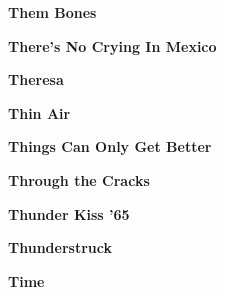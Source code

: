 \newline
\vspace{10pt} 
\begin{center}\textbf{Them Bones}\end{center}
\newline
\vspace{10pt} 
\begin{center}\textbf{There's No Crying In Mexico}\end{center}
\newline
\vspace{10pt} 
\begin{center}\textbf{Theresa}\end{center}
\newline
\vspace{10pt} 
\begin{center}\textbf{Thin Air}\end{center}
\newline
\vspace{10pt} 
\begin{center}\textbf{Things Can Only Get Better}\end{center}
\newline
\vspace{10pt} 
\begin{center}\textbf{Through the Cracks}\end{center}
\newline
\vspace{10pt} 
\begin{center}\textbf{Thunder Kiss '65}\end{center}
\newline
\vspace{10pt} 
\begin{center}\textbf{Thunderstruck}\end{center}
\newline
\vspace{10pt} 
\begin{center}\textbf{Time}\end{center}
\newline
\vspace{10pt} 
